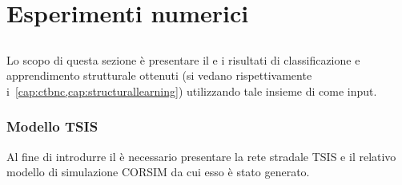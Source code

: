 
\chapter{Esperimenti numerici}\label{cap:esperimenti}
\omissis{}

\section{}\label{sec:dataset-1}
Lo scopo di questa sezione è presentare il  e i risultati di classificazione e apprendimento strutturale ottenuti (si vedano rispettivamente i~\vref{cap:ctbnc,cap:structurallearning}) utilizzando tale insieme di \emph{} come input.

\subsection{Modello TSIS}\label{subsec:tsis-simple-model}
Al fine di introdurre il  è necessario presentare la rete stradale \acs{TSIS} e il relativo modello di simulazione \acs{CORSIM} da cui esso è stato generato.

